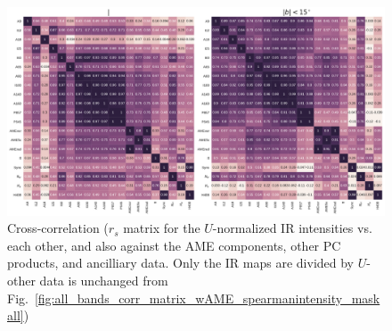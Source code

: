               \begin{figure}
                \includegraphics[width=\textwidth]{../Plots/ch_allsky/all_bands_corr_matrix_wAME_spearmanU_norm_masked.pdf}
                \centering
                \caption{Cross-correlation ($r_{s}$ matrix for the $U$-normalized IR intensities vs. each other, and also against the AME components, other PC products, and ancilliary data. Only the IR maps are divided by $U$- other data is unchanged from Fig.~\ref{fig:all_bands_corr_matrix_wAME_spearmanintensity_maskall})}
                \label{fig:all_bands_corr_matrix_wAME_spearmanU_norm_masked}
              \end{figure}

